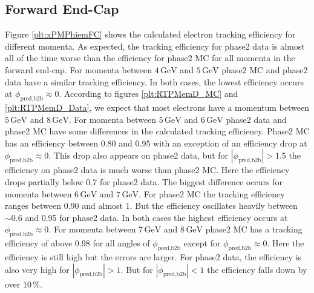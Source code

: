 \documentclass[a4paper,11pt,twosided,final,german,openbib,pdftex,listof=totoc,bibliography=totoc]{scrbook}
\begin{document}
\subsection{Forward End-Cap}
\label{sec:MFC}

Figure \ref{plt:xPMPhiemFC} shows the calculated electron tracking efficiency for different momenta. As expected, the tracking efficiency for phase2 data is almost all of the time worse than the efficiency for phase2 MC for all momenta in the forward end-cap. For momenta between $4\,\textrm{GeV}$ and $5\,\textrm{GeV}$ phase2 MC and phase2 data have a similar tracking efficiency. In both cases, the lowest efficiency occurs at $\phi_{\textrm{pred,b2b}} \approx 0$. According to figures \ref{plt:RTPMemD_MC} and \ref{plt:RTPMemD_Data}, we expect that most electrons have a momentum between $5\,\textrm{GeV}$ and $8\,\textrm{GeV}$. For momenta between $5\,\textrm{GeV}$ and $6\,\textrm{GeV}$ phase2 data and phase2 MC have some differences in the calculated tracking efficiency. Phase2 MC has an efficiency between 0.80 and 0.95 with an exception of an efficiency drop at $\phi_{\textrm{pred,b2b}} \approx 0$. This drop also appears on phase2 data, but for $|\phi_{\textrm{pred,b2b}}| > 1.5$ the efficiency on phase2 data is much worse than phase2 MC. Here the efficiency drops partially below 0.7 for phase2 data.
The biggest difference occurs for momenta between $6\,\textrm{GeV}$ and $7\,\textrm{GeV}$. For phase2 MC the tracking efficiency ranges between 0.90 and almost 1. But the efficiency oscillates heavily between $\sim 0.6$ and 0.95 for phase2 data. In both cases the highest efficiency occurs at $\phi_{\textrm{pred,b2b}} \approx 0$. 
For momenta between $7\,\textrm{GeV}$ and $8\,\textrm{GeV}$ phase2 MC has a tracking efficiency of above 0.98 for all angles of $\phi_{\textrm{pred,b2b}}$ except for $\phi_{\textrm{pred,b2b}} \approx 0$. Here the efficiency is still high but the errors are larger. For phase2 data, the efficiency is also very high for $|\phi_{\textrm{pred,b2b}}| > 1$. But for $|\phi_{\textrm{pred,b2b}}| < 1$ the efficiency falls down by over $10\,\%$.
\end{document}
